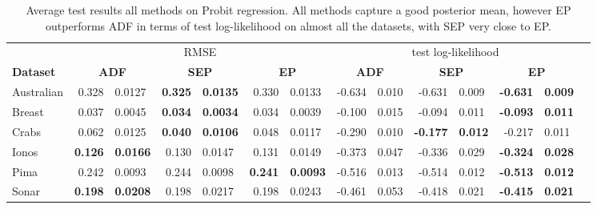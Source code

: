 \begin{table} 
\small
\centering \label{tab:probit_results} \begin{tabular}{l@{\ica}r@{$\pm$}l@{\ica}r@{$\pm$}l@{\ica}r@{$\pm$}l@{\ica}r@{$\pm$}l@{\ica}r@{$\pm$}
	l@{\ica}r@{$\pm$}l@{\ica}r@{$\pm$}}\hline 
{} & \multicolumn{6}{c}{RMSE} & \multicolumn{6}{c}{test log-likelihood} \\
\bf{Dataset}&\multicolumn{2}{c}{\bf{ ADF }}&\multicolumn{2}{c}{\bf{ SEP }}&\multicolumn{2}{c}{\bf{ EP }} &\multicolumn{2}{c}{\bf{ ADF }}&\multicolumn{2}{c}{\bf{ SEP }}&\multicolumn{2}{c}{\bf{ EP }} \\ \hline 
%
Australian&0.328&0.0127&\bf{0.325}&\bf{0.0135}&0.330&0.0133
	&-0.634&0.010&-0.631&0.009&\bf{-0.631}&\bf{0.009}\\
%
Breast&0.037&0.0045&\bf{0.034}&\bf{0.0034}&0.034&0.0039
	&-0.100&0.015&-0.094&0.011&\bf{-0.093}&\bf{0.011}\\
%
Crabs&0.062&0.0125&\bf{0.040}&\bf{0.0106}&0.048&0.0117
	&-0.290&0.010&\bf{-0.177}&\bf{0.012}&-0.217&0.011\\
%
Ionos&\bf{0.126}&\bf{0.0166}&0.130&0.0147&0.131&0.0149
	&-0.373&0.047&-0.336&0.029&\bf{-0.324}&\bf{0.028}\\
%
Pima&0.242&0.0093&0.244&0.0098&\bf{0.241}&\bf{0.0093}
	&-0.516&0.013&-0.514&0.012&\bf{-0.513}&\bf{0.012}\\
%
Sonar&\bf{0.198}&\bf{0.0208}&0.198&0.0217&0.198&0.0243
	&-0.461&0.053&-0.418&0.021&\bf{-0.415}&\bf{0.021}\\
 \hline \end{tabular} 
 \caption{ Average test results all methods on Probit regression. All methods capture a good posterior mean, however EP outperforms ADF in terms of test log-likelihood on almost all the datasets, with SEP very close to EP.}
 \end{table} 
